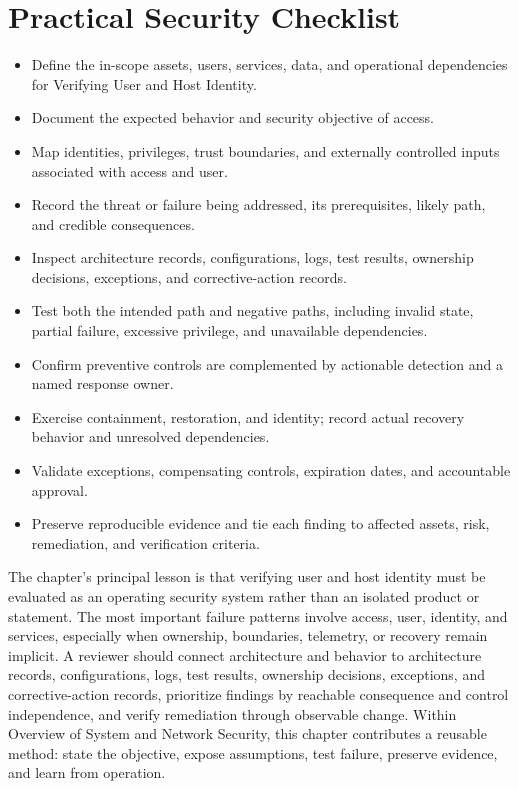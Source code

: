 \documentclass[11pt]{article}
\begin{document}
\section*{Practical Security Checklist}
\begin{itemize}[label=$\square$]
\item Define the in-scope assets, users, services, data, and operational dependencies for Verifying User and Host Identity.
\item Document the expected behavior and security objective of access.
\item Map identities, privileges, trust boundaries, and externally controlled inputs associated with access and user.
\item Record the threat or failure being addressed, its prerequisites, likely path, and credible consequences.
\item Inspect architecture records, configurations, logs, test results, ownership decisions, exceptions, and corrective-action records.
\item Test both the intended path and negative paths, including invalid state, partial failure, excessive privilege, and unavailable dependencies.
\item Confirm preventive controls are complemented by actionable detection and a named response owner.
\item Exercise containment, restoration, and identity; record actual recovery behavior and unresolved dependencies.
\item Validate exceptions, compensating controls, expiration dates, and accountable approval.
\item Preserve reproducible evidence and tie each finding to affected assets, risk, remediation, and verification criteria.
\end{itemize}
\begin{synthesisbox}
The chapter's principal lesson is that verifying user and host identity must be evaluated as an operating security system rather than an isolated product or statement. The most important failure patterns involve access, user, identity, and services, especially when ownership, boundaries, telemetry, or recovery remain implicit. A reviewer should connect architecture and behavior to architecture records, configurations, logs, test results, ownership decisions, exceptions, and corrective-action records, prioritize findings by reachable consequence and control independence, and verify remediation through observable change. Within Overview of System and Network Security, this chapter contributes a reusable method: state the objective, expose assumptions, test failure, preserve evidence, and learn from operation.
\end{synthesisbox}
\end{document}
